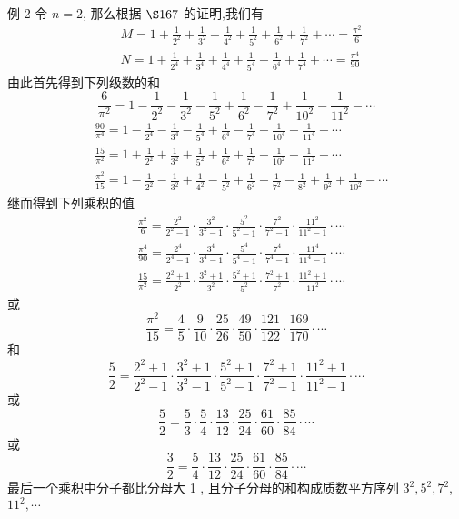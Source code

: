 例 2 令 $n=2$, 那么根据 $\S 167$ 的证明,我们有
\[
\begin{aligned}
& M=1+\frac{1}{2^{2}}+\frac{1}{3^{2}}+\frac{1}{4^{2}}+\frac{1}{5^{2}}+\frac{1}{6^{2}}+\frac{1}{7^{2}}+\cdots=\frac{\pi^{2}}{6} \\
& N=1+\frac{1}{2^{4}}+\frac{1}{3^{4}}+\frac{1}{4^{4}}+\frac{1}{5^{4}}+\frac{1}{6^{4}}+\frac{1}{7^{4}}+\cdots=\frac{\pi^{4}}{90}
\end{aligned}
\]
由此首先得到下列级数的和
\[
\frac{6}{\pi^{2}}=1-\frac{1}{2^{2}}-\frac{1}{3^{2}}-\frac{1}{5^{2}}+\frac{1}{6^{2}}-\frac{1}{7^{2}}+\frac{1}{10^{2}}-\frac{1}{11^{2}}-\cdots
\]
\[
\begin{aligned}
& \frac{90}{\pi^{4}}=1-\frac{1}{2^{4}}-\frac{1}{3^{4}}-\frac{1}{5^{4}}+\frac{1}{6^{4}}-\frac{1}{7^{4}}+\frac{1}{10^{4}}-\frac{1}{11^{4}}-\cdots \\
& \frac{15}{\pi^{2}}=1+\frac{1}{2^{2}}+\frac{1}{3^{2}}+\frac{1}{5^{2}}+\frac{1}{6^{2}}+\frac{1}{7^{2}}+\frac{1}{10^{2}}+\frac{1}{11^{2}}+\cdots \\
& \frac{\pi^{2}}{15}=1-\frac{1}{2^{2}}-\frac{1}{3^{2}}+\frac{1}{4^{2}}-\frac{1}{5^{2}}+\frac{1}{6^{2}}-\frac{1}{7^{2}}-\frac{1}{8^{2}}+\frac{1}{9^{2}}+\frac{1}{10^{2}}-\cdots
\end{aligned}
\]
继而得到下列乘积的值
\[
\begin{aligned}
& \frac{\pi^{2}}{6}=\frac{2^{2}}{2^{2}-1} \cdot \frac{3^{2}}{3^{2}-1} \cdot \frac{5^{2}}{5^{2}-1} \cdot \frac{7^{2}}{7^{2}-1} \cdot \frac{11^{2}}{11^{2}-1} \cdot \cdots \\
& \frac{\pi^{4}}{90}=\frac{2^{4}}{2^{4}-1} \cdot \frac{3^{4}}{3^{4}-1} \cdot \frac{5^{4}}{5^{4}-1} \cdot \frac{7^{4}}{7^{4}-1} \cdot \frac{11^{4}}{11^{4}-1} \cdot \cdots \\
& \frac{15}{\pi^{2}}=\frac{2^{2}+1}{2^{2}} \cdot \frac{3^{2}+1}{3^{2}} \cdot \frac{5^{2}+1}{5^{2}} \cdot \frac{7^{2}+1}{7^{2}} \cdot \frac{11^{2}+1}{11^{2}} \cdot \cdots
\end{aligned}
\]
或
\[
\frac{\pi^{2}}{15}=\frac{4}{5} \cdot \frac{9}{10} \cdot \frac{25}{26} \cdot \frac{49}{50} \cdot \frac{121}{122} \cdot \frac{169}{170} \cdot \cdots
\]
和
\[
\frac{5}{2}=\frac{2^{2}+1}{2^{2}-1} \cdot \frac{3^{2}+1}{3^{2}-1} \cdot \frac{5^{2}+1}{5^{2}-1} \cdot \frac{7^{2}+1}{7^{2}-1} \cdot \frac{11^{2}+1}{11^{2}-1} \cdot \cdots
\]
或
\[
\frac{5}{2}=\frac{5}{3} \cdot \frac{5}{4} \cdot \frac{13}{12} \cdot \frac{25}{24} \cdot \frac{61}{60} \cdot \frac{85}{84} \cdot \cdots
\]
或
\[
\frac{3}{2}=\frac{5}{4} \cdot \frac{13}{12} \cdot \frac{25}{24} \cdot \frac{61}{60} \cdot \frac{85}{84} \cdot \cdots
\]
最后一个乘积中分子都比分母大 1 , 且分子分母的和构成质数平方序列 $3^{2}, 5^{2}, 7^{2}$, $11^{2}, \cdots$

